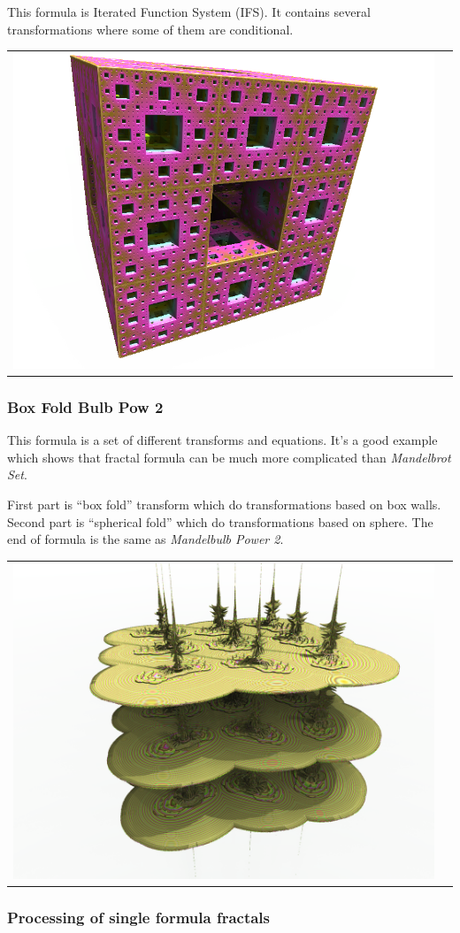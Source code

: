 This formula is Iterated Function System (IFS). It contains several
transformations where some of them are conditional. \nopagebreak

\begin{tabular}{l l}
    \includegraphics[width=0.3\linewidth]{img/manual/media/formula_menger_sponge.png}
	& 
	\begin{minipage}[b]{0.5\linewidth}
	    
	\end{minipage}
\end{tabular} 

\subsubsection{Box Fold Bulb Pow 2}
\nopagebreak

This formula is a set of different transforms and equations. It's a good example
which shows that fractal formula can be much more complicated than
\emph{Mandelbrot Set}.

First part is ``box fold'' transform which do
transformations based on box walls. Second part is ``spherical
fold'' which do transformations based on sphere.
The end of formula is the same as \emph{Mandelbulb Power 2}.\nopagebreak

\begin{tabular}{l l}
	\includegraphics[width=0.3\linewidth]{img/manual/media/formula_box_fold_pwr2.png}	
	& 
	\begin{minipage}[b]{0.5\linewidth}
	    
	\end{minipage}
\end{tabular} 

\subsubsection{Processing of single formula fractals}

